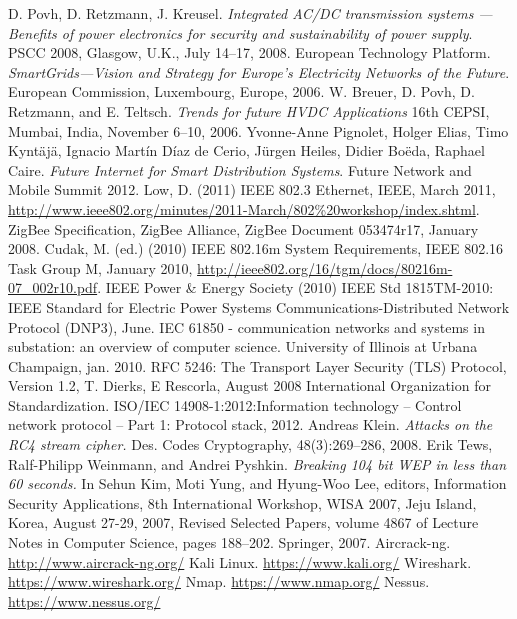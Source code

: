 \documentclass[11pt,oneside]{book}
\begin{document}
\begin{thebibliography}{99}
 D. Povh, D. Retzmann, J. Kreusel. \emph{Integrated AC/DC transmission systems — Benefits of power electronics for security and sustainability of power supply}. PSCC 2008, Glasgow, U.K., July 14–17, 2008. 
 European Technology Platform. \emph{SmartGrids—Vision and Strategy for Europe’s Electricity Networks of the Future}. European Commission, Luxembourg, Europe, 2006.
 W. Breuer, D. Povh, D. Retzmann, and E. Teltsch. \emph{Trends for future HVDC Applications} 16th CEPSI, Mumbai, India, November 6–10, 2006.
 Yvonne-Anne Pignolet, Holger Elias, Timo Kyntäjä, Ignacio Martín Díaz de Cerio, Jürgen Heiles, Didier Boëda, Raphael Caire. \emph{Future Internet for Smart Distribution Systems}. Future Network and Mobile Summit 2012.
 Low, D. (2011) IEEE 802.3 Ethernet, IEEE, March 2011, \url{http://www.ieee802.org/minutes/2011-March/802\%20workshop/index.shtml}.
 ZigBee Specification, ZigBee Alliance, ZigBee Document 053474r17, January 2008.
 Cudak, M. (ed.) (2010) IEEE 802.16m System Requirements, IEEE 802.16 Task Group M, January 2010, \url{http://ieee802.org/16/tgm/docs/80216m-07_002r10.pdf}.
 IEEE Power \& Energy Society (2010) IEEE Std 1815TM-2010: IEEE Standard for Electric Power Systems Communications-Distributed Network Protocol (DNP3), June.
 IEC 61850 - communication networks and systems in substation: an overview of computer science.
University of Illinois at Urbana Champaign, jan. 2010.
 RFC 5246: The Transport Layer Security (TLS) Protocol, Version 1.2, T. Dierks, E Rescorla, August 2008
 International Organization for Standardization. ISO/IEC 14908-1:2012:Information technology – Control network protocol – Part 1: Protocol stack, 2012.
 Andreas Klein. \emph{Attacks on the RC4 stream cipher.} Des. Codes Cryptography, 48(3):269–286, 2008.
 Erik Tews, Ralf-Philipp Weinmann, and Andrei Pyshkin. \emph{Breaking 104 bit WEP in less than 60 seconds.} In Sehun Kim, Moti Yung, and Hyung-Woo Lee, editors, Information Security Applications, 8th International Workshop, WISA 2007, Jeju Island, Korea, August 27-29, 2007, Revised Selected Papers, volume 4867 of Lecture Notes in Computer Science, pages 188–202. Springer, 2007.
 Aircrack-ng. \url{http://www.aircrack-ng.org/}
 Kali Linux. \url{https://www.kali.org/}
 Wireshark. \url{https://www.wireshark.org/}
 Nmap. \url{https://www.nmap.org/}
 Nessus. \url{https://www.nessus.org/}

\end{thebibliography}
\end{document}
